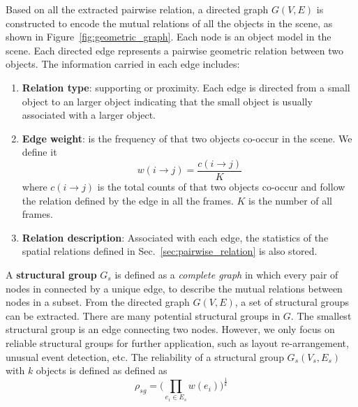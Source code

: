 Based on all the extracted pairwise relation, a directed graph $G(V,E)$ is constructed to encode the mutual relations of all the objects in the scene, as shown in Figure~\ref{fig:geometric_graph}. 
Each node is an object model in the scene.   
%
Each directed edge represents a pairwise geometric relation between two objects. 
%
The information carried in each edge includes:
\begin{enumerate}
	\item \textbf{Relation type}:  supporting or proximity. Each edge is directed from a small object to an larger object indicating that the small object is usually associated with a larger object. 
	\item \textbf{Edge weight}: is the frequency of that two objects co-occur in the scene. We define it 
	\begin{equation}
		w(i\to j)= \frac{c(i\to j)}{K}	\end{equation}
	where $c(i\to j)$ is the total counts of that two objects co-occur and follow the relation defined by the edge in all the frames. $K$ is the number of all frames.
	
	\item \textbf{Relation description}: Associated with each edge, the statistics of the spatial relations defined in Sec.~\ref{sec:pairwise_relation} is also stored. 
\end{enumerate}




A \textbf{structural group} $G_s$ is defined as a \emph{complete graph} in which every pair of nodes in connected by a unique edge, to describe the mutual relations between nodes in a subset.
%
From the directed graph $G(V,E)$, a set of structural groups can be extracted. There are many potential structural groups in $G$. The smallest structural group is an edge connecting two nodes. 
%
However, we only focus on reliable structural groups for further application, such as layout re-arrangement, unusual event detection, etc. 
%
The reliability of a structural group $G_s(V_s,E_s)$ with $k$ objects is defined as defined as
\begin{equation}
	\label{eq:reliability_sg}
	\rho_{sg} = \big(\prod_{e_i \in E_s} {w(e_i)}\big)^{\frac{1}{k}}
\end{equation}



